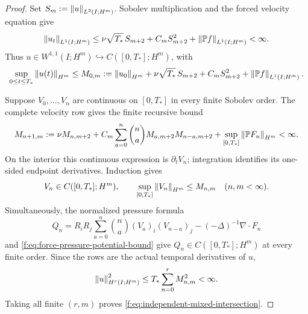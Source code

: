 \begin{proof}
Set \(S_m:=\left\lVert u\right\rVert_{L^2(I;H^m)}\).  Sobolev multiplication and the forced
velocity equation give
\begin{equation}
 \left\lVert u_t\right\rVert_{L^1(I;H^m)}
 \le \nu\sqrt{T_*}\,S_{m+2}+C_mS_{m+2}^2
     +\left\lVert \mathbb P f\right\rVert_{L^1(I;H^m)}<\infty.
 \label{f:eq:forced-spatial-to-first-temporal-row}
\end{equation}
Thus \(u\in W^{1,1}(I;H^m)\hookrightarrow C([0,T_*];H^m)\), with
\begin{equation}
 \sup_{0\le t\le T_*}\left\lVert u(t)\right\rVert_{H^m}
 \le M_{0,m}:=\left\lVert u_0\right\rVert_{H^m}
 +\nu\sqrt{T_*}\,S_{m+2}+C_mS_{m+2}^2
 +\left\lVert \mathbb P f\right\rVert_{L^1(I;H^m)}.
 \label{f:eq:forced-spatial-column-base-trace}
\end{equation}

Suppose \(V_0,\ldots,V_n\) are continuous on \([0,T_*]\) in every finite
Sobolev order.  The complete velocity row gives the finite recursive bound
\begin{equation}
 M_{n+1,m}:=\nu M_{n,m+2}
 +C_m\sum_{a=0}^n\binom na M_{a,m+2}M_{n-a,m+2}
 +\sup_{[0,T_*]}\left\lVert \mathbb P F_n\right\rVert_{H^m}<\infty.
 \label{f:eq:forced-spatial-column-temporal-recursion}
\end{equation}
On the interior this continuous expression is \(\partial_tV_n\); integration
identifies its one-sided endpoint derivatives.  Induction gives
\begin{equation}
 V_n\in C([0,T_*];H^m),
 \qquad \sup_{[0,T_*]}\left\lVert V_n\right\rVert_{H^m}\le M_{n,m}
 \quad(n,m<\infty).
 \label{f:eq:forced-spatial-column-continuous-rows}
\end{equation}
Simultaneously, the normalized pressure formula
\[
 Q_n=R_iR_j\sum_{a=0}^n\binom na(V_a)_i(V_{n-a})_j
 -(-\Delta)^{-1}\nabla\!\cdot F_n
\]
and \eqref{f:eq:force-pressure-potential-bound} give
\(Q_n\in C([0,T_*];H^m)\) at every finite order.  Since the rows are the
actual temporal derivatives of \(u\),
\begin{equation}
 \left\lVert u\right\rVert_{H^r(I;H^m)}^2
 \le T_*\sum_{n=0}^{r}M_{n,m}^2<\infty.
 \label{f:eq:forced-spatial-column-to-mixed-intersection}
\end{equation}
Taking all finite \((r,m)\) proves
\eqref{f:eq:independent-mixed-intersection}.
\end{proof}

